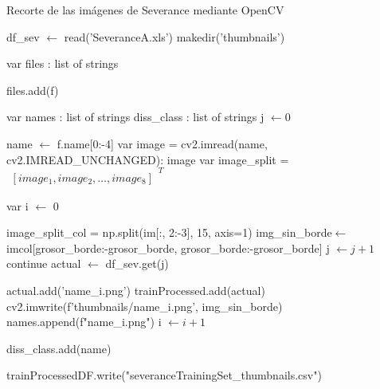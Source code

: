  \begin{algorithm}[H]
	\caption{Recorte de las imágenes de Severance mediante OpenCV}
		\label{fig:cortarseverance}
	\begin{algorithmic}
		
		\State  df\_sev $\gets$ read('SeveranceA.xls')
		\State makedir('thumbnails')
		\EndIf
		
		\State var files : list of strings
		
		\State files.add(f)
		\EndIf
		\EndFor
		
		\State var names : list of strings
		\State diss\_class : list of strings
		\State j $\gets 0$
		
		\State name $\gets$ f.name[0:-4]
		\State var image = cv2.imread(name, cv2.IMREAD\_UNCHANGED): image
		\State var image\_split = $\begin{matrix}
			[ image_1, image_2, \ldots, image_8 ] \end{matrix}^T$	
		
		
		\State var i $\gets$ 0
		
		\State image\_split\_col = np.split(im[:, 2:-3], 15, axis=1)
		\State img\_sin\_borde$\gets$ imcol[grosor\_borde:-grosor\_borde, grosor\_borde:-grosor\_borde]
		  
		\State j $\gets j + 1$  
		\State continue
		\Else
		\State actual  $\gets$ df\_sev.get(j)
		
		\State	actual.add('{name}\_{i}.png')
		\State	trainProcessed.add(actual)
		\EndIf
		\State cv2.imwrite(f'thumbnails/{name}\_{i}.png', img\_sin\_borde)
		\State names.append(f"{name}\_{i}.png")
		\State i $\gets i + 1 $
		
		\State diss\_class.add(name)
		\EndFor
		
		\EndFor
		\EndIf	 
		\EndFor
		\State trainProcessedDF.write("severanceTrainingSet\_thumbnails.csv") 
		\EndProcedure
	\end{algorithmic}
\end{algorithm}
 
